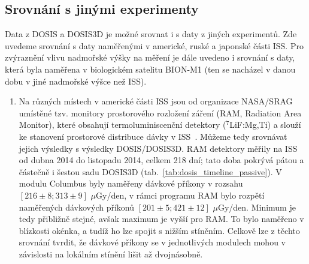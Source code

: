 \subsection{Srovnání s jinými experimenty}
Data z DOSIS a DOSIS3D je možné srovnat i s daty z jiných experimentů. Zde uvedeme srovnání s daty naměřenými v americké, ruské a japonské části ISS. Pro zvýraznění vlivu nadmořské výšky na měření je dále uvedeno i srovnání s daty, která byla naměřena v biologickém satelitu BION-M1 (ten se nacházel v danou dobu v jiné nadmořské výšce než ISS).
\begin{enumerate}
\item Na různých místech v americké části ISS jsou od organizace NASA/SRAG umístěné tzv. monitory prostorového rozložení záření (RAM, Radiation Area Monitor), které obsahují termoluminiscenční detektory ($^7$LiF:Mg,Ti) a slouží ke stanovení prostorové distribuce dávky v ISS~\cite{RAM}. Můžeme tedy srovnávat jejich výsledky s výsledky DOSIS/DOSIS3D. RAM detektory měřily na ISS od dubna 2014 do listopadu 2014, celkem 218 dní; tato doba pokrývá pátou a částečně i šestou sadu DOSIS3D (tab.~\ref{tab:dosis_timeline_passive}). V modulu Columbus byly naměřeny dávkové příkony v rozsahu $[216\pm8;313\pm9]$ $\mu$Gy/den, v rámci programu RAM bylo rozpětí naměřených dávkových příkonů $[201\pm5;421\pm12]$ $\mu$Gy/den. Minimum je tedy přibližně stejné, avšak maximum je vyšší pro RAM. To bylo naměřeno v
  blízkosti okénka, a tudíž ho lze spojit s nižším stíněním. Celkově lze z těchto srovnání tvrdit, že dávkové příkony se v jednotlivých modulech mohou v závislosti na lokálním stínění lišit až dvojnásobně.~\cite{dosis}


\end{enumerate}
